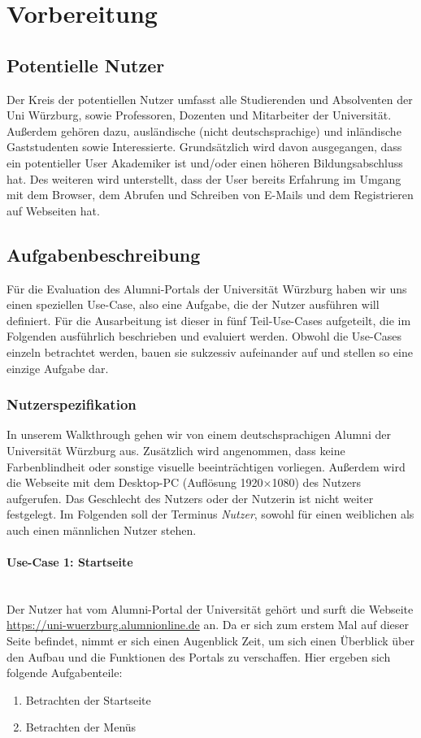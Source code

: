 \section{Vorbereitung}
\subsection{Potentielle Nutzer}
Der Kreis der potentiellen Nutzer umfasst alle Studierenden und Absolventen der Uni Würzburg, sowie Professoren, Dozenten und Mitarbeiter der Universität. Außerdem gehören dazu, ausländische (nicht deutschsprachige) und inländische Gaststudenten sowie Interessierte. Grundsätzlich wird davon ausgegangen, dass ein potentieller User Akademiker ist und/oder einen höheren Bildungsabschluss hat. Des weiteren wird unterstellt, dass der User bereits Erfahrung im Umgang mit dem Browser, dem Abrufen und Schreiben von E-Mails und dem Registrieren auf Webseiten hat. 

\subsection{Aufgabenbeschreibung}
Für die Evaluation des Alumni-Portals der Universität Würzburg haben wir uns einen speziellen Use-Case, also eine Aufgabe, die der Nutzer ausführen will definiert. 
Für die Ausarbeitung ist dieser in fünf Teil-Use-Cases aufgeteilt, die im Folgenden ausführlich beschrieben und evaluiert werden. Obwohl die Use-Cases einzeln betrachtet werden, bauen sie sukzessiv aufeinander auf und stellen so eine einzige Aufgabe dar.

\subsubsection*{Nutzerspezifikation}
In unserem Walkthrough gehen wir von einem deutschsprachigen Alumni der Universität Würzburg aus. Zusätzlich wird angenommen, dass keine Farbenblindheit oder sonstige visuelle beeinträchtigen vorliegen. 
Außerdem wird die Webseite mit dem Desktop-PC (Auflösung 1920$\times$1080) des Nutzers aufgerufen. 
Das Geschlecht des Nutzers oder der Nutzerin ist nicht weiter festgelegt. Im Folgenden soll der Terminus \emph{Nutzer}, sowohl für einen weiblichen als auch einen männlichen Nutzer stehen.

\paragraph{Use-Case 1: Startseite}\quad\\
Der Nutzer hat vom Alumni-Portal der Universität gehört und surft die Webseite \url{https://uni-wuerzburg.alumnionline.de} an. Da er sich zum erstem Mal auf dieser Seite befindet, nimmt er sich einen Augenblick Zeit, um sich einen Überblick über den Aufbau und die Funktionen des Portals zu verschaffen.
Hier ergeben sich folgende Aufgabenteile:
\begin{enumerate}

		\item Betrachten der Startseite
		\item Betrachten der Menüs
\end{enumerate}

